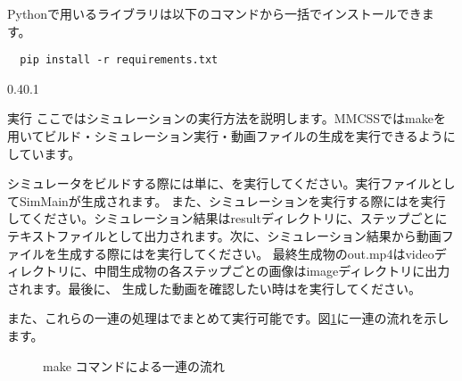 \documentclass[vipdfmx,a4paper,11pt]{jsarticle}
\makeatletter
\renewcommand{\section}{%
  \@startsection{section}{1}{\z@}%
  {0.4\Cvs}{0.1\Cvs}%
  {\normalfont\large\headfont\raggedright}}
\makeatother
\begin{document}
Pythonで用いるライブラリは以下のコマンドから一括でインストールできます。

\begin{lstlisting}
  pip install -r requirements.txt
\end{lstlisting}

\section{実行}
ここではシミュレーションの実行方法を説明します。MMCSSではmakeを用いてビルド・シミュレーション実行・動画ファイルの生成を実行できるようにしています。

シミュレータをビルドする際には単に、を実行してください。実行ファイルとしてSimMainが生成されます。
また、シミュレーションを実行する際にはを実行してください。シミュレーション結果はresultディレクトリに、ステップごとに
テキストファイルとして出力されます。次に、シミュレーション結果から動画ファイルを生成する際にはを実行してください。
最終生成物のout.mp4はvideoディレクトリに、中間生成物の各ステップごとの画像はimageディレクトリに出力されます。最後に、
生成した動画を確認したい時はを実行してください。


また、これらの一連の処理はでまとめて実行可能です。図\ref{fig:appMake}に一連の流れを示します。

\begin{figure}[tbp]
  \centering
  \caption{make コマンドによる一連の流れ}
  \label{fig:appMake}
\end{figure}
\end{document}

